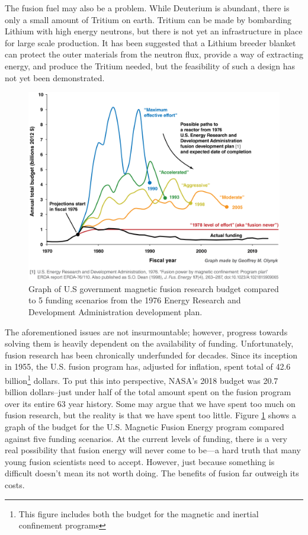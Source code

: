 The fusion fuel may also be a problem. While Deuterium is abundant, there is only a small amount of Tritium on earth. Tritium can be made by bombarding Lithium with high energy neutrons, but there is not yet an infrastructure in place for large scale production. It has been suggested that a Lithium breeder blanket can protect the outer materials from the neutron flux, provide a way of extracting energy, and produce the Tritium needed, but the feasibility of such a design has not yet been demonstrated.

\begin{figure}
    \centering
    \includegraphics[width=12cm]{figures/fusion_never.png}
    \caption{Graph of U.S government magnetic fusion research budget compared to 5 funding scenarios from the 1976 Energy Research and Development Administration development plan.\cite{1976_fusion}}
    \label{fig:fusion_never}
\end{figure}
The aforementioned issues are not insurmountable; however, progress towards solving them is heavily dependent on the availability of funding. Unfortunately, fusion research has been chronically underfunded for decades. Since its inception in 1955, the U.S. fusion program has, adjusted for inflation, spent total of 42.6 billion\footnote{This figure includes both the budget for the magnetic and inertial confinement programs} dollars. To put this into perspective, NASA's 2018 budget was 20.7 billion dollars--just under half of the total amount spent on the fusion program over its entire 63 year history. Some may argue that we have spent too much on fusion research, but the reality is that we have spent too little. Figure \ref{fig:fusion_never} shows a graph of the budget for the U.S. Magnetic Fusion Energy program compared against five funding scenarios\cite{1976_fusion}. At the current levels of funding, there is a very real possibility that fusion energy will never come to be---a hard truth that many young fusion scientists need to accept.
However, just because something is difficult doesn't mean its not worth doing. The benefits of fusion far outweigh its costs.

